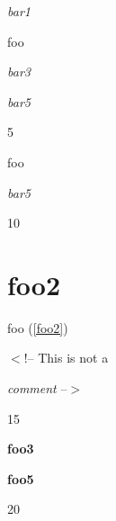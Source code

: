 \emph{bar1}

foo

\emph{bar3}


\emph{bar5}

5

foo

\emph{bar5}

10

\part{foo2 }
\label{foo2}

foo (\autoref{foo2})

$<$!-- This is not a

\emph{comment} --$>$

15

\textbf{foo3}

\textbf{foo5}

20
